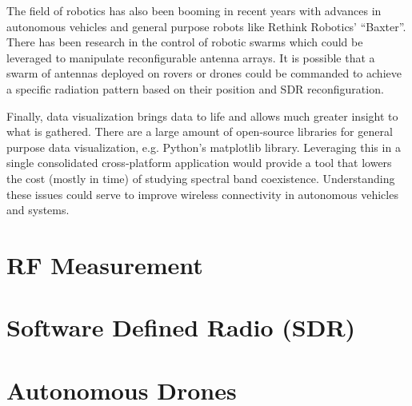The field of robotics has also been booming in recent years with advances in
autonomous vehicles and general purpose robots like Rethink Robotics'
``Baxter''. There has been research in the control of robotic swarms
\cite{software_defined_radio} which could be leveraged to manipulate
reconfigurable antenna arrays. It is possible that a swarm of antennas deployed on
rovers or drones could be commanded to achieve a specific radiation pattern
based on their position and SDR reconfiguration. 

Finally, data visualization brings data to life and allows much greater
insight to what is gathered. There are a large amount of open-source libraries
for general purpose data visualization, e.g. Python's matplotlib library.
Leveraging this in a single consolidated cross-platform application would provide
a tool that lowers the cost (mostly in time) of studying spectral band coexistence.
Understanding these issues could serve to improve wireless connectivity in
autonomous vehicles and systems. 


\section{RF Measurement}

\section{Software Defined Radio (SDR)}

\section{Autonomous Drones}
